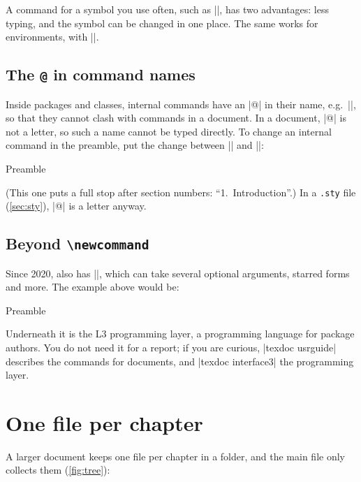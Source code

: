 A command for a symbol you use often, such as \code|\Tenv|, has two advantages:
less typing, and the symbol can be changed in one place.
The same works for environments, with \code|\newenvironment{name}{before}{after}|.

\subsection{The \texttt{@} in command names}

Inside packages and classes, internal commands have an \code|@| in their name, e.g.\ \code|\@title|,
so that they cannot clash with commands in a document.
In a document, \code|@| is not a letter, so such a name cannot be typed directly.
To change an internal command in the preamble, put the change between \code|\makeatletter| and \code|\makeatother|:

\begin{codeblocktitled}{Preamble}
\makeatletter
\renewcommand{\@seccntformat}[1]{\csname the#1\endcsname.\quad}
\makeatother
\end{codeblocktitled}

(This one puts a full stop after section numbers: \enquote{1.~Introduction}.)
In a \texttt{.sty} file (\autoref{sec:sty}), \code|@| is a letter anyway.

\subsection{Beyond \texttt{\textbackslash newcommand}}

Since 2020,  also has \code|\NewDocumentCommand|,
which can take several optional arguments, starred forms and more.
The example above would be:

\begin{codeblocktitled}{Preamble}
\end{codeblocktitled}

Underneath it is the L3 programming layer, a programming language for package authors.
You do not need it for a report;
if you are curious, \code|texdoc usrguide| describes the commands for documents,
and \code|texdoc interface3| the programming layer.

\section{One file per chapter}\label{sec:input}

A larger document keeps one file per chapter in a folder,
and the main file only collects them (\autoref{fig:tree}):

